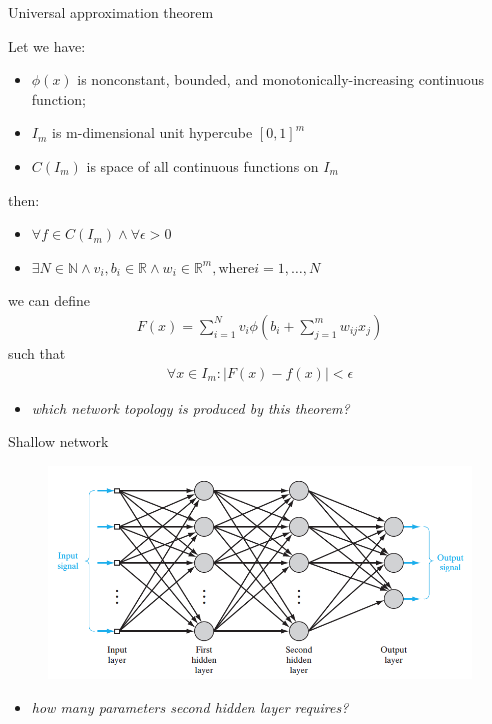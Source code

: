\documentclass{beamer}
\begin{document}
\begin{frame}{Universal approximation theorem}

Let we have:
\begin{itemize}
\item $\phi\left(x\right)$ is nonconstant, bounded, and monotonically-increasing continuous function;
\item $I_m$ is m-dimensional unit hypercube $\left[0, 1\right]^m$
\item $C\left(I_m\right)$ is space of all continuous functions on $I_m$
\end{itemize}

then: 
\begin{itemize}
\item $\forall f \in C\left(I_m\right) \wedge \forall \epsilon > 0$ 
\item $\exists N \in \mathbb{N} \wedge v_i, b_i \in \mathbb{R} \wedge w_i \in \mathbb{R}^m, \text{where} i = 1, \ldots, N$
\end{itemize}
we can define
\begin{eqnarray*}
F\left(x\right) = \sum_{i=1}^N v_i \phi\left(b_i + \sum_{j=1}^m w_{ij} x_j\right)
\end{eqnarray*}
such that
\begin{eqnarray*}
\forall x \in I_m: \left| F\left(x\right) - f\left(x\right)\right| < \epsilon
\end{eqnarray*}

\begin{itemize}
\item \textit{which network topology is produced by this theorem?}
\end{itemize}

\end{frame}


\begin{frame}{Shallow network}

\begin{figure}[h!]
  \centering
  \includegraphics[width=1\textwidth]{images/mlp.png}
\end{figure}

\begin{itemize}
\item \textit{how many parameters second hidden layer requires?}
\end{itemize}

\end{frame}
\end{document}
